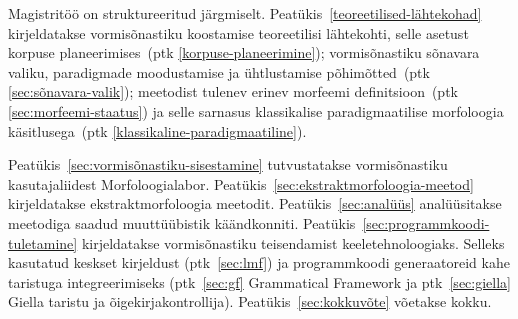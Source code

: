 \documentclass[12pt,a4paper]{article}
\begin{document}

Magistritöö on struktureeritud järgmiselt. 
Peatükis~\ref{teoreetilised-lähtekohad} kirjeldatakse vormisõnastiku koostamise teoreetilisi lähtekohti, selle asetust korpuse planeerimises~(ptk \ref{korpuse-planeerimine}); vormisõnastiku sõnavara valiku, paradigmade moodustamise ja ühtlustamise põhimõtted~(ptk \ref{sec:sõnavara-valik}); meetodist tulenev erinev morfeemi definitsioon~(ptk \ref{sec:morfeemi-staatus}) ja selle sarnasus klassikalise paradigmaatilise morfoloogia käsitlusega~(ptk \ref{klassikaline-paradigmaatiline}). %

Peatükis~\ref{sec:vormisõnastiku-sisestamine} tutvustatakse vormisõnastiku kasutajaliidest Morfoloogia\-labor. 
Peatükis~\ref{sec:ekstraktmorfoloogia-meetod} kirjeldatakse ekstraktmorfoloogia meetodit. 
Peatükis~\ref{sec:analüüs} analüüsitakse meetodiga saadud muuttüübistik käändkonniti. 
Peatükis~\ref{sec:programmkoodi-tuletamine} kirjeldatakse vormisõnastiku teisendamist keele\-tehnoloogiaks. Selleks kasutatud keskset kirjeldust (ptk~\ref{sec:lmf}) ja programm\-koodi generaatoreid kahe taristuga integreerimiseks (ptk~\ref{sec:gf} Grammatical Framework ja ptk~\ref{sec:giella} Giella taristu ja õigekirjakontrollija).
Peatükis~\ref{sec:kokkuvõte} võetakse kokku.
\end{document}
